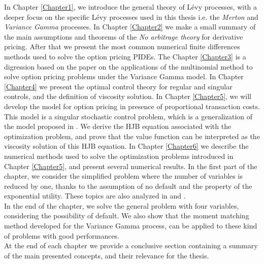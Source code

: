 In Chapter \ref{Chapter1}, we introduce the general theory of Lévy processes, with a deeper focus on the specific Lévy processes used in this thesis i.e.  
the \emph{Merton} and \emph{Variance Gamma} processes.   
In Chapter \ref{Chapter2} we make a small summary of the main assumptions and theorems of the \emph{No arbitrage theory} for derivative pricing. After that we present 
the most common numerical finite differences methods used to solve the option pricing PIDEs. 
The Chapter \ref{Chapter3} is a digression based on the paper \cite{Canta2} on the applications 
of the multinomial method to solve option pricing problems under the Variance Gamma model. 
In Chapter \ref{Chapter4} we present the optimal control theory for regular and singular controls, and the definition of viscosity solution. 
In Chapter \ref{Chapter5}, we will develop the model for option pricing in presence of proportional transaction costs. This model is a singular stochastic
control problem, which is a generalization of the model proposed in \cite{DaPaZa93}. We derive the HJB equation associated with the optimization problem, 
and prove that the value function can be interpreted as the viscosity solution of this HJB equation.  
In Chapter \ref{Chapter6} we describe the numerical methods used to solve the optimization problems introduced in Chapter \ref{Chapter5}, and present several numerical results. 
In the first part of the chapter, we consider the simplified problem where the number of variables is reduced by one, 
thanks to the assumption of no default and the property of the exponential utility. 
These topics are also analyzed in \cite{Canta} and \cite{Canta3}.\\
In the end of the chapter, we solve the general problem with four variables, considering the possibility of default. 
We also show that the moment matching method developed for 
the Variance Gamma process, can be applied to these kind of problems with good performances. \\
At the end of each chapter we provide a conclusive section containing a summary of the main presented concepts, and their relevance for the thesis. 

